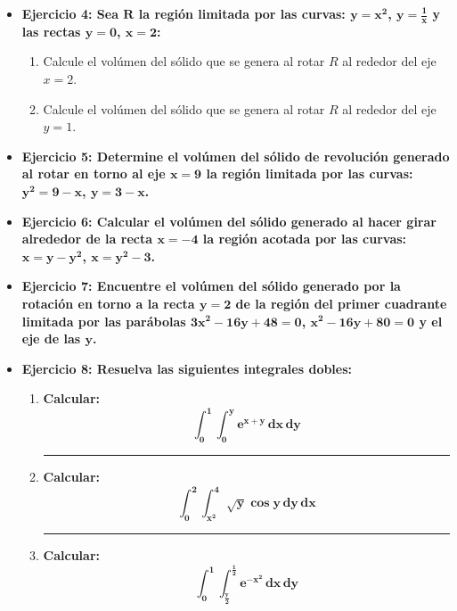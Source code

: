 \documentclass[12pt]{article}
\begin{document}
\begin{itemize}
\begin{enumerate}[label=\alph*.]
            \end{enumerate}
        
        \item \textbf{Ejercicio 4: Sea $\bm{R}$ la región limitada por las curvas: $\bm{y = x^2}$, $\bm{y = \frac{1}{x}}$ y las rectas $\bm{y = 0}$, $\bm{x = 2}$:}
            \begin{enumerate}[label=\alph*)]
                \item Calcule el volúmen del sólido que se genera al rotar $R$ al rededor del eje $x = 2$.
                \item Calcule el volúmen del sólido que se genera al rotar $R$ al rededor del eje $y = 1$.
            \end{enumerate}
        
        
        \item \textbf{Ejercicio 5: Determine el volúmen del sólido de revolución generado al rotar en torno al eje $\bm{x = 9}$ la región limitada por las curvas: $\bm{y^2 = 9 - x}$, $\bm{y = 3 - x}$.}
        
        
        \item \textbf{Ejercicio 6: Calcular el volúmen del sólido generado al hacer girar alrededor de la recta $\bm{x = -4}$ la región acotada por las curvas: $\bm{x = y - y^2}$, $\bm{x = y^2 - 3}$.}
        
        
        \item \textbf{Ejercicio 7: Encuentre el volúmen del sólido generado por la rotación en torno a la recta $\bm{y = 2}$ de la región del primer cuadrante limitada por las parábolas $\bm{3x^2 - 16y + 48 = 0}$, $\bm{x^2 - 16y + 80 = 0}$ y el eje de las $\bm{y}$.}
        
        
        \item \textbf{Ejercicio 8: Resuelva las siguientes integrales dobles:} \vspace{0.5cm}
            \begin{enumerate}
                \hrule
                \item \textbf{Calcular:} \[\bm{\int_{0}^{1} \int_{0}^{y} e^{x + y} \, dx \, dy}\]
                

                \hrule
                \item \textbf{Calcular:} \[\bm{\int_{0}^{2} \int_{x^2}^{4} \sqrt{y} \cos{y} \, dy \, dx}\]
                

                \hrule
                \item \textbf{Calcular:} \[\bm{\int_{0}^{1} \int_{\frac{y}{2}}^{\frac{1}{2}} e^{-x^2} \, dx \, dy}\]
                


\end{enumerate}
\end{itemize}
\end{document}
